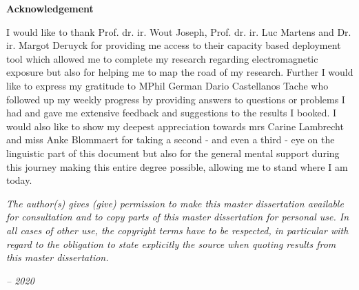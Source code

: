 \thispagestyle{empty}    %

\begin{center}
\textbf{Acknowledgement}
\end{center}

I would like to thank Prof. dr. ir. Wout Joseph, Prof. dr. ir. Luc Martens and Dr. ir. Margot Deruyck
for providing me access to their capacity based deployment tool which allowed me to 
complete my research regarding electromagnetic exposure but  also for helping me to map the road of my research.
Further I would like to express my gratitude to MPhil German Dario Castellanos Tache
who followed up my weekly progress by providing answers to  questions or problems I had and 
gave me extensive feedback and suggestions to the results I booked.
I would also like to show my deepest appreciation towards mrs Carine Lambrecht and 
miss Anke Blommaert for taking a second - and even a third - eye on the linguistic part of this document but also for the general 
mental support during this journey making this entire degree possible, allowing me to stand where I am today. 

\vspace*{\fill}
\emph{
The author(s) gives (give) permission to make this master dissertation available for
consultation and to copy parts of this master dissertation for personal use.
In all cases of other use, the copyright terms have to be respected, in particular with regard to
the obligation to state explicitly the source when quoting results from this master dissertation.
}
\begin{flushright}
\emph{-- 2020}
\end{flushright}